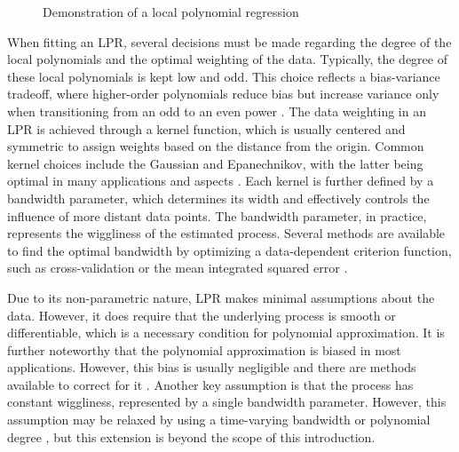 \documentclass[man, floatsintext]{apa7}
\begin{document}
\begin{figure}[!ht]
  \caption{Demonstration of a local polynomial regression}
  \label{fig:locpol_dem}
\end{figure}

When fitting an LPR, several decisions must be
made regarding the degree of the local polynomials and the optimal weighting of
the data. Typically, the degree of these local polynomials is kept low and odd.
This choice reflects a bias-variance tradeoff, where higher-order polynomials
reduce bias but increase variance only when transitioning from an odd
to an even power \parencite{ruppert_multivariate_1994}. The data weighting
in an LPR is achieved through a
kernel function, which is usually centered and symmetric to assign weights
based
on the distance from the origin. Common kernel choices include the Gaussian and
Epanechnikov, with the latter being optimal in many applications and
aspects \parencite{fan_local_1997}. Each kernel is further defined by a
bandwidth parameter, which determines its width and effectively controls the
influence of more distant data points. The bandwidth parameter, in practice,
represents the wiggliness of the estimated process.
Several methods are available to find the optimal bandwidth by optimizing a
data-dependent criterion function, such as cross-validation or the mean
integrated squared error \parencite{kohler_review_2014, debruyne_model_2008}.

Due to its non-parametric nature, LPR makes minimal assumptions about the data.
However, it does require that the underlying process is smooth or
differentiable, which is a necessary condition for polynomial approximation.
It is further noteworthy that the polynomial approximation is biased in
most applications. However, this bias is usually negligible and there are
methods available to correct for it \parencite{R-nprobust}.
Another key assumption is that the process has constant
wiggliness, represented by a single bandwidth parameter. However,
this assumption may be relaxed by using a time-varying bandwidth
\parencite{fan_data-driven_1995} or
polynomial degree \parencite{fan_adaptive_1995}, but this extension
is beyond the scope of this introduction.
\end{document}

